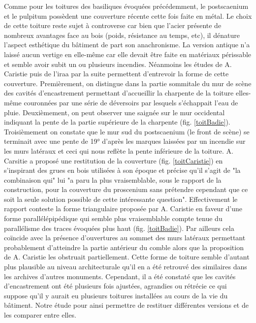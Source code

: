 		Comme pour les toitures des \glspl{basilique} évoquées précédemment, le \gls{postscaenium} et le \gls{pulpitum} possèdent une couverture récente cette fois faite en métal. Le choix de cette toiture reste sujet à controverse car bien que l'acier présente de nombreux avantages face au bois (poids, résistance au temps, etc), il dénature l'aspect esthétique du bâtiment de part son anachronisme. La version antique n'a laissé aucun vertige en elle-même car elle devait être faite en matériaux périssable et semble avoir subit un ou plusieurs incendies. Néanmoins les études de A. Caristie puis de l'\gls{iraa} par la suite permettent d'entrevoir la forme de cette couverture. Premièrement, on distingue dans la partie sommitale du mur de scène des cavités d'encastrement permettant d'accueillir la charpente de la toiture elles-même couronnées par une série de déversoirs par lesquels s’échappait l’eau de pluie. Deuxièmement, on peut observer une saignée sur le mur occidental indiquant la pente de la partie supérieure de la charpente (fig. \ref{toitBadie}). Troisièmement on constate que le mur sud du \gls{postscaenium} (le front de scène) se terminait avec une pente de 19° d'après les marques laissées par un incendie sur les murs latéraux et ceci qui nous reflète la pente inférieure de la toiture. A. Carsitie a proposé une restitution de la couverture (fig. \ref{toitCaristie}) en s'inspirant des grues en bois utilisées à son époque et précise qu'il s'agit de "la combinaison qui" lui "a paru la plus vraisemblable, sous le rapport de la construction, pour la couverture du proscenium sans prétendre cependant que
ce soit la seule solution possible de cette intéressante question". Effectivement le rapport \cite{orangeTxt} conteste la forme triangulaire proposée par A. Caristie en faveur d'une forme parallélépipédique qui semble plus vraisemblable compte tenue du parallélisme des traces évoquées plus haut (fig. \ref{toitBadie}). Par ailleurs cela coïncide avec la présence d'ouvertures au sommet des murs latéraux permettant probablement d'atteindre la partie antérieur du comble alors que la proposition de A. Caristie les obstruait partiellement. Cette forme de toiture semble d'autant plus plausible au niveau architecturale qu'il en a été retrouvé des similaires dans les archives d'autres monuments. Cependant, il a été constaté que les cavités d'encastrement ont été plusieurs fois ajustées, agrandies ou rétrécie ce qui suppose qu'il y aurait eu plusieurs toitures installées au cours de la vie du bâtiment. Notre étude pour ainsi permettre de restituer différentes versions et de les comparer entre elles.
		
